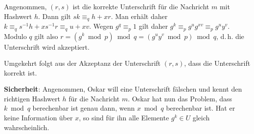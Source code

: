 \begin{Beweis}
    Angenommen, $(r, s)$ ist die korrekte Unterschrift für die Nachricht $m$
    mit Hashwert $h$.
    Dann gilt $sk \equiv_q h + xr$.
    Man erhält daher $k \equiv_q s^{-1} h + xs^{-1} r \equiv_q u + xv$.
    Wegen $g^q \equiv_p 1$ gilt daher
    $g^k \equiv_p g^u g^{xv} \equiv_p g^u y^v$.
    Modulo $q$ gilt also $r = (g^k \bmod p) \bmod q = (g^u y^v \bmod p) \bmod q$,
    d.\,h. die Unterschrift wird akzeptiert.

    Umgekehrt folgt aus der Akzeptanz der Unterschrift $(r, s)$, dass
    die Unterschrift korrekt ist.
\end{Beweis}

\linie

\textbf{Sicherheit}:
Angenommen, Oskar will eine Unterschrift fälschen und kennt den richtigen Hashwert $h$ für
die Nachricht $m$.
Oskar hat nun das Problem, dass $k \bmod q$ berechenbar ist genau dann, wenn $x \bmod q$
berechenbar ist.
Hat er keine Information über $x$, so sind für ihn alle Elemente $g^k \in U$ gleich
wahrscheinlich.

\pagebreak
